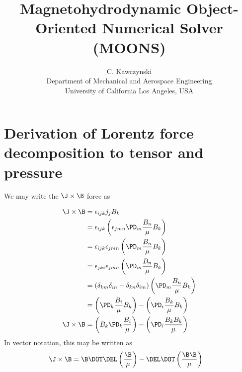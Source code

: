 \documentclass[11pt]{article}
\begin{document}
\doublespacing
\title{Magnetohydrodynamic Object-Oriented Numerical Solver (MOONS)}
\author{C. Kawczynski \\
Department of Mechanical and Aerospace Engineering \\
University of California Los Angeles, USA\\
}
\maketitle

\section{Derivation of Lorentz force decomposition to tensor and pressure}
We may write the $\J\times \B$ force as

\begin{equation}
\begin{aligned}
	\J\times \B
	&= \epsilon_{ijk} j_j B_k \\
	&= \epsilon_{ijk} \left( \epsilon_{jmn} \PD_m \frac{B_n}{\mu} B_k \right) \\
	&= \epsilon_{ijk} \epsilon_{jmn} \left( \PD_m \frac{B_n}{\mu} B_k \right) \\
	&= \epsilon_{jki} \epsilon_{jmn} \left( \PD_m \frac{B_n}{\mu} B_k \right) \\
	&= (\delta_{km} \delta_{in} - \delta_{kn} \delta_{im} ) \left( \PD_m \frac{B_n}{\mu} B_k \right) \\
	&= \left( \PD_k \frac{B_i}{\mu} B_k \right) -
	\left( \PD_i \frac{B_k}{\mu} B_k \right) \\
	\J\times \B &= \left( B_k \PD_k \frac{B_i}{\mu} \right) -
	\left( \PD_i \frac{B_k B_k}{\mu} \right)
\end{aligned}
\end{equation}
In vector notation, this may be written as
\begin{equation}
\begin{aligned}
	\J \times \B
	&= \B \DOT \DEL \left( \frac{\B}{\mu} \right) - \DEL \DOT \left( \frac{\B \B}{\mu} \right)
\end{aligned}
\end{equation}
\end{document}
